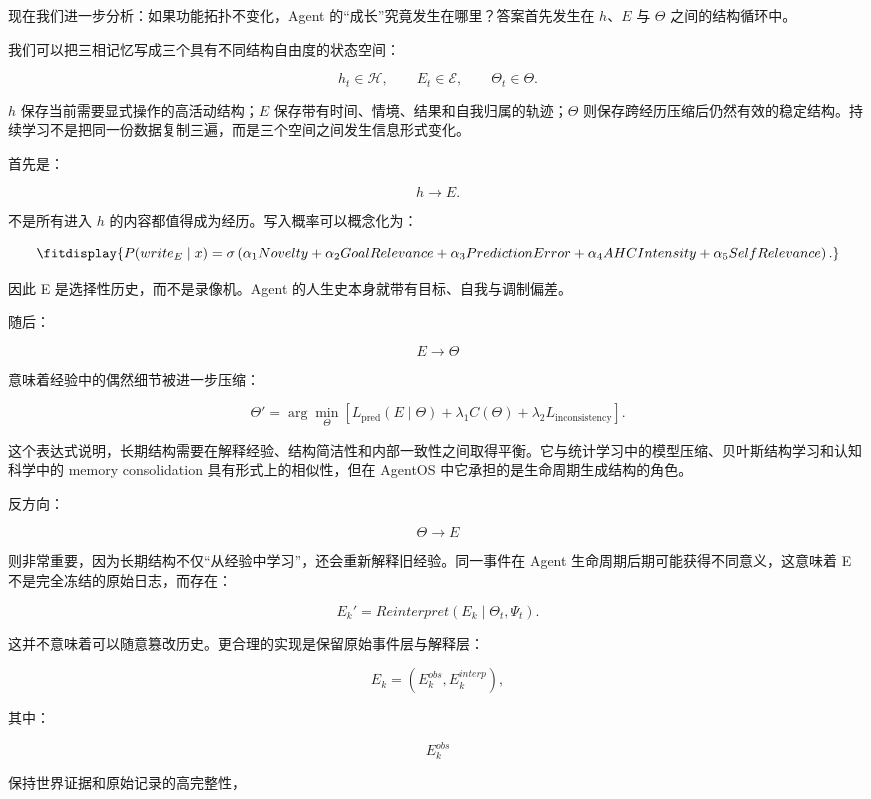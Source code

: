 现在我们进一步分析：如果功能拓扑不变化，Agent 的“成长”究竟发生在哪里？答案首先发生在 $h$、$E$ 与 $\Theta$ 之间的结构循环中。

我们可以把三相记忆写成三个具有不同结构自由度的状态空间：

\[
h_t\in\mathcal{H},
\qquad
E_t\in\mathcal{E},
\qquad
\Theta_t\in\mathcal{\Theta}.
\]

$h$ 保存当前需要显式操作的高活动结构；$E$ 保存带有时间、情境、结果和自我归属的轨迹；$\Theta$ 则保存跨经历压缩后仍然有效的稳定结构。持续学习不是把同一份数据复制三遍，而是三个空间之间发生信息形式变化。

首先是：

\[
h\rightarrow E.
\]

不是所有进入 $h$ 的内容都值得成为经历。写入概率可以概念化为：

\[
\fitdisplay{
P(write_E\mid x)
=
\sigma
\left(
\alpha_1 Novelty
+
\alpha_2 GoalRelevance
+
\alpha_3 PredictionError
+
\alpha_4 AHCIntensity
+
\alpha_5 SelfRelevance
\right).
}
\]

因此 E 是选择性历史，而不是录像机。Agent 的人生史本身就带有目标、自我与调制偏差。

随后：

\[
E\rightarrow\Theta
\]

意味着经验中的偶然细节被进一步压缩：

\[
\Theta'
=
\arg\min_{\Theta}
\left[
L_{\mathrm{pred}}
(E\mid\Theta)
+
\lambda_1C(\Theta)
+
\lambda_2L_{\mathrm{inconsistency}}
\right].
\]

这个表达式说明，长期结构需要在解释经验、结构简洁性和内部一致性之间取得平衡。它与统计学习中的模型压缩、贝叶斯结构学习和认知科学中的 memory consolidation 具有形式上的相似性，但在 AgentOS 中它承担的是生命周期生成结构的角色。

反方向：

\[
\Theta\rightarrow E
\]

则非常重要，因为长期结构不仅“从经验中学习”，还会重新解释旧经验。同一事件在 Agent 生命周期后期可能获得不同意义，这意味着 E 不是完全冻结的原始日志，而存在：

\[
E_k'
=
Reinterpret(E_k\mid\Theta_t,\Psi_t).
\]

这并不意味着可以随意篡改历史。更合理的实现是保留原始事件层与解释层：

\[
E_k
=
(E_k^{obs},E_k^{interp}),
\]

其中：

\[
E_k^{obs}
\]

保持世界证据和原始记录的高完整性，

